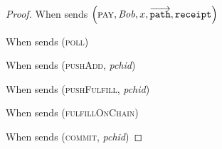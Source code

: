 \begin{proof}
  When \environment{} sends $\left(\textsc{pay}, \mathit{Bob}, x,
  \overrightarrow{\mathtt{path}}, \mathtt{receipt}\right)$

  When \environment{} sends (\textsc{poll})

  When \environment{} sends (\textsc{pushAdd}, \textit{pchid})

  When \environment{} sends (\textsc{pushFulfill}, \textit{pchid})

  When \environment{} sends (\textsc{fulfillOnChain})

  When \environment{} sends (\textsc{commit}, \textit{pchid})
\end{proof}
